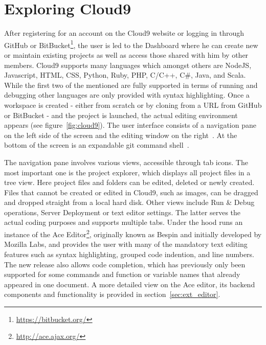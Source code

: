 \section{Exploring Cloud9}
\label{sec:Motivation}


After registering for an account on the Cloud9 website or logging in through GitHub or BitBucket\footnote{\url{https://bitbucket.org/}},
the user is led to the Dashboard where he can create new or maintain existing projects as well as access those
shared with him by other members.
Cloud9 supports many languages which amongst others are NodeJS, Javascript, HTML, CSS, Python, Ruby, PHP, C/C++, C\#, Java, and Scala.
While the first two of the mentioned are fully supported in terms of running and debugging other languages are only provided with syntax highlighting.
Once a workspace is created - either from scratch or by cloning from a URL from GitHub or BitBucket -
and the project is launched, the actual editing environment appears (see figure~\ref{fig:cloud9}).
The user interface consists of a navigation pane~ on the left side of the screen and the editing window on the right~.
At the bottom of the screen is an expandable git command shell~.

The navigation pane involves various views, accessible through tab icons. The most important one is the project explorer,
which displays all project files in a tree view. Here project files and folders can be edited, deleted or newly created.
Files that cannot be created or edited in Cloud9, such as images, can be dragged and dropped straight from a local hard disk.
Other views include Run \& Debug operations, Server Deployment or text editor settings.
The latter serves the actual coding purposes and supports multiple tabs. Under the hood runs an instance of the Ace
Editor\footnote{\url{http://ace.ajax.org/}}, originally known as Bespin and initially developed by Mozilla Labs,
and provides the user with many of the mandatory text editing features such as syntax highlighting, grouped code indention, and line numbers.
The new release also allows code completion, which has previously only been supported for some commands and
function or variable names that already appeared in one document.
A more detailed view on the Ace editor, its backend components and functionality is provided in section~\ref{sec:ext_editor}.

